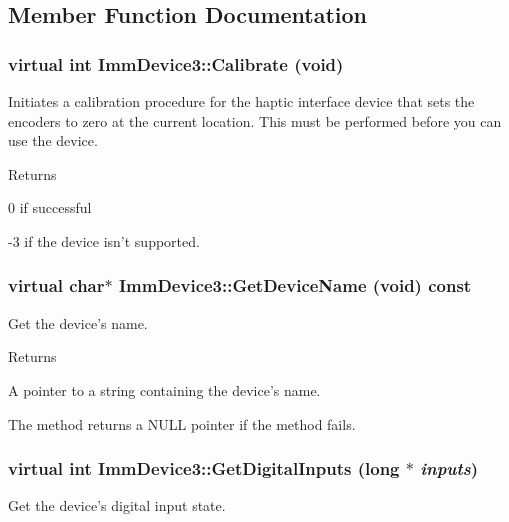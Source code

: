 \subsection{Member Function Documentation}
\hypertarget{classImmDevice3_a2515bf1ac7e7e7f3a381f453356a0ac1}{
\subsubsection[{Calibrate}]{\setlength{\rightskip}{0pt plus 5cm}virtual int ImmDevice3::Calibrate (void)}}
\label{classImmDevice3_a2515bf1ac7e7e7f3a381f453356a0ac1}
Initiates a calibration procedure for the haptic interface device that sets the encoders to zero at the current location. This must be performed before you can use the device.

\begin{DoxyReturn}{Returns}

\end{DoxyReturn}
0 if successful

-\/3 if the device isn't supported. \hypertarget{classImmDevice3_ae9ce3e0bee3de88456247c158cece3de}{
\subsubsection[{GetDeviceName}]{\setlength{\rightskip}{0pt plus 5cm}virtual char$\ast$ ImmDevice3::GetDeviceName (void) const}}
\label{classImmDevice3_ae9ce3e0bee3de88456247c158cece3de}
Get the device's name.

\begin{DoxyReturn}{Returns}

\end{DoxyReturn}
A pointer to a string containing the device's name.

The method returns a NULL pointer if the method fails. \hypertarget{classImmDevice3_a4898c71b383a2fc6cd86ea7983f9f14f}{
\subsubsection[{GetDigitalInputs}]{\setlength{\rightskip}{0pt plus 5cm}virtual int ImmDevice3::GetDigitalInputs (long $\ast$ {\em inputs})}}
\label{classImmDevice3_a4898c71b383a2fc6cd86ea7983f9f14f}
Get the device's digital input state.


